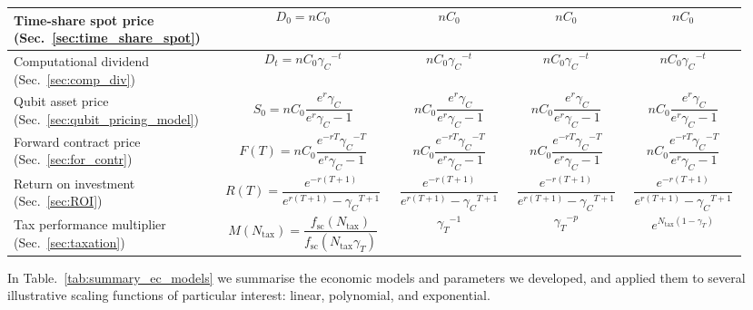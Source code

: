 \begin{table}[!htb]
\begin{tabular}{|p{0.255\linewidth}|p{0.22\linewidth}|p{0.155\linewidth}|p{0.155\linewidth}|p{0.155\linewidth}|}
	\hline
	Time-share spot price (Sec.~\ref{sec:time_share_spot}) & \[D_0=n C_0\] & \[nC_0\] & \[nC_0\] & \[nC_0\]\\
	\hline
	Computational dividend (Sec.~\ref{sec:comp_div}) & \[D_t=n C_0 {\gamma_C}^{-t}\] & \[n C_0 {\gamma_C}^{-t}\] & \[n C_0 {\gamma_C}^{-t}\] & \[n C_0 {\gamma_C}^{-t}\]\\
	\hline
	Qubit asset price (Sec.~\ref{sec:qubit_pricing_model}) & \[S_0=n C_0 \frac{e^r \gamma_C}{e^r \gamma_C - 1}\] & \[n C_0 \frac{e^r \gamma_C}{e^r \gamma_C - 1}\] & \[n C_0 \frac{e^r \gamma_C}{e^r \gamma_C - 1}\] & \[n C_0 \frac{e^r \gamma_C}{e^r \gamma_C - 1}\]\\
	\hline
	Forward contract price (Sec.~\ref{sec:for_contr}) & \[F(T)=n C_0 \frac{e^{-rT}{\gamma_C}^{-T}}{e^{r}\gamma_C-1}\] & \[n C_0 \frac{e^{-rT}{\gamma_C}^{-T}}{e^{r}\gamma_C-1}\] & \[n C_0 \frac{e^{-rT}{\gamma_C}^{-T}}{e^{r}\gamma_C-1}\] & \[n C_0 \frac{e^{-rT}{\gamma_C}^{-T}}{e^{r}\gamma_C-1}\]\\
	\hline
	Return on investment (Sec.~\ref{sec:ROI}) & \[R(T)=\frac{e^{-r(T+1)}}{e^{r(T+1)}-{\gamma_C}^{T+1}}\] & \[\frac{e^{-r(T+1)}}{e^{r(T+1)}-{\gamma_C}^{T+1}}\] & \[\frac{e^{-r(T+1)}}{e^{r(T+1)}-{\gamma_C}^{T+1}}\] & \[\frac{e^{-r(T+1)}}{e^{r(T+1)}-{\gamma_C}^{T+1}}\]\\
	\hline
	Tax performance multiplier (Sec.~\ref{sec:taxation}) & \[M(N_\text{tax})=\frac{f_\text{sc}(N_\text{tax})}{f_\text{sc}(N_\text{tax} \gamma_T)}\] & \[{\gamma_T}^{-1}\] & \[{\gamma_T}^{-p}\] & \[e^{N_\text{tax}(1-\gamma_T)}\]\\
	\hline
\end{tabular}
\end{table}

\renewcommand{\arraystretch}{1}
\renewcommand{\tablename}{ALG.}

In Table.~\ref{tab:summary_ec_models} we summarise the economic models and parameters we developed, and applied them to several illustrative scaling functions of particular interest: linear, polynomial, and exponential. 